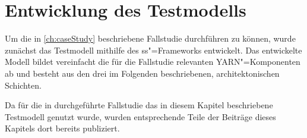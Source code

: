 \chapter{Entwicklung des Testmodells}
\label{ch:model}

Um die in \cref{ch:caseStudy} beschriebene Fallstudie durchführen zu können, wurde zunächst das Testmodell mithilfe des \gls{ss}"=Frameworks entwickelt.
Das entwickelte Modell bildet vereinfacht die für die Fallstudie relevanten \gls{YARN}"=Komponenten ab und besteht aus den drei im Folgenden beschriebenen, architektonischen Schichten.

Da für die in \cite{Eberhardinger2018} durchgeführte Fallstudie das in diesem Kapitel beschriebene Testmodell genutzt wurde, wurden entsprechende Teile der Beiträge dieses Kapitels dort bereits publiziert.








